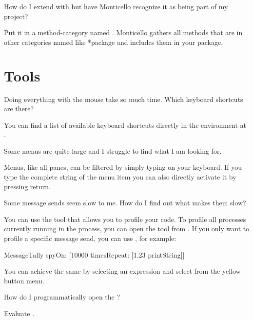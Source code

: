\documentclass[a4paper,10pt,twoside]{book}
\begin{document}
{\begin{faq}
How do I extend  with  but have Monticello recognize it as being part of my  project?
\end{faq}
\answer
Put it in a method-category named .
Monticello gathers all methods that are in other categories named like *package and includes them in your package.

\section{Tools}

\begin{faq}
Doing everything with the mouse take so much time. 
Which keyboard shortcuts are there?
\end{faq}
\answer
You can find a list of available keyboard shortcuts directly in the environment at .

\begin{faq}
Some menus are quite large and I struggle to find what I am looking for.
\end{faq}
\answer
Menus, like all panes, can be filtered by simply typing on your keyboard. 
If you type the complete string of the menu item you can also directly activate it by pressing return.

\begin{faq}
Some message sends seem slow to me.
How do I find out what makes them slow?
\end{faq}
\answer
You can use the  tool that allows you to profile your code. 
To profile all processes currently running in the process, you can open the tool from .
If you only want to profile a specific message send, you can use , for example:
\begin{code}{}
MessageTally spyOn: [10000 timesRepeat: [1.23 printString]]
\end{code}
You can achieve the same by selecting an expression and select  from the yellow button menu.

\begin{faq}
How do I programmatically open the  ?
\end{faq}
\answer
Evaluate .

}
\end{document}
